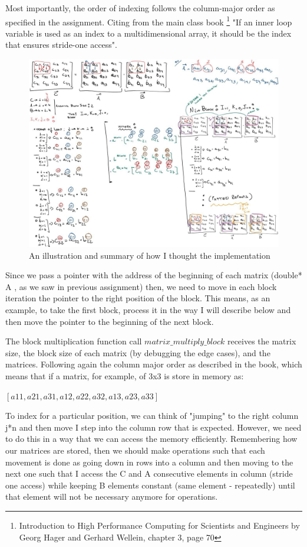 \documentclass[unicode,11pt,a4paper,oneside,numbers=endperiod,openany]{scrartcl}
\begin{document}
Most importantly, the order of indexing follows the column-major order as specified in the assignment. Citing from the main class book \footnote{Introduction to High Performance Computing for Scientists and Engineers by Georg Hager and Gerhard Wellein, chapter 3, page 70}
"If an inner loop variable is used as an index to a multidimensional array, it should be the index that ensures stride-one access".

\begin{figure}[H]
    \centering
    \includegraphics[width=\textwidth]{./exercise3/final-idea.jpg}
    \caption{An illustration and summary of how I thought the implementation} 
\end{figure}

Since we pass a pointer with the address of the beginning of each matrix (double* A , as we saw in previous assignment) 
then, we need to move in each block iteration the pointer to the right position of the block. 
This means, as an example, to take the first block, process it in the way I will describe below and then move the pointer to the beginning of the next block.

The block multiplication function call $matrix\_multiply\_block$ receives the matrix size, the block size of each matrix (by debugging the edge cases), and the matrices. 
Following again the column major order as described in the book, which means that if a matrix, for example, of 3x3 is store in memory as:

$[a11, a21, a31, a12, a22, a32, a13, a23, a33]$ 

To index for a particular position, we can think of "jumping" to the right column j*n and then move I step into the column row that is expected. 
However, we need to do this in a way that we can access the memory efficiently. Remembering how our matrices are stored, then we should make operations such that 
each movement is done as going down in rows into a column and then moving to the next one such that I access the C and A consecutive elements in column (stride one access)
while keeping B elements constant (same element - repeatedly) until that element will not be necessary anymore for operations. 
\end{document}
